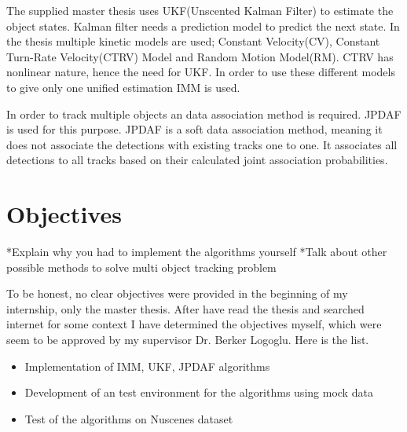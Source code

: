 \documentclass[peerreview]{IEEEtran}
\begin{document}
The supplied master thesis uses UKF(Unscented Kalman Filter) to estimate the object states. Kalman filter needs a prediction model to predict the next state. In the thesis multiple kinetic models are used; Constant Velocity(CV), Constant Turn-Rate Velocity(CTRV) Model and Random Motion Model(RM). CTRV has nonlinear nature, hence the need for UKF. In order to use these different models to give only one unified estimation IMM is used.

In order to track multiple objects an data association method is required. JPDAF is used for this purpose. JPDAF is a soft data association method, meaning it does not associate the detections with existing tracks one to one. It associates all detections to all tracks based on their calculated joint association probabilities.

%
%


\section{Objectives}
*Explain why you had to implement the algorithms yourself
*Talk about other possible methods to solve multi object tracking problem

To be honest, no clear objectives were provided in the beginning of my internship, only the master thesis. After have read the thesis and searched internet for some context I have determined the objectives myself, which were seem to be approved by my supervisor Dr. Berker Logoglu. Here is the list.
\begin{itemize}
\item Implementation of IMM, UKF, JPDAF algorithms
\item Development of an test environment for the algorithms using mock data
\item Test of the algorithms on Nuscenes dataset
\end{itemize}
\end{document}
